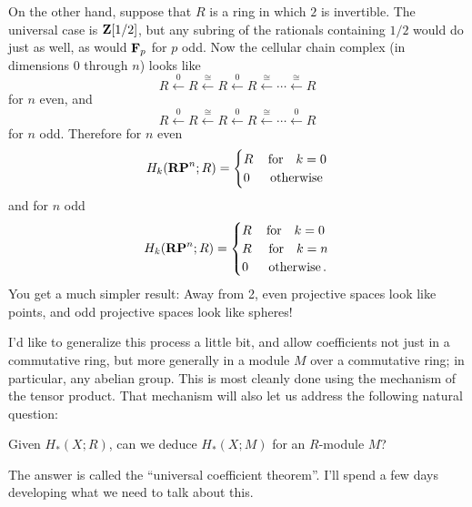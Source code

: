 On the other hand, suppose that $R$ is a ring in which $2$ is invertible.
The universal case is $\mathbf Z[1/2]$, but any subring of the rationals containing
$1/2$ would do just as well, as would $\mathbf F_p$ for $p$ odd. 
Now the cellular chain complex (in dimensions 0 through $n$)
looks like
\[
R\xleftarrow{0}R\xleftarrow{\cong}R\xleftarrow{0}R
\xleftarrow{\cong}\cdots\xleftarrow{\cong}R
\]
for $n$ even, and
\[
R\xleftarrow{0}R\xleftarrow{\cong}R\xleftarrow{0}R
\xleftarrow{\cong}\cdots\xleftarrow{0}R
\]
for $n$ odd. Therefore for $n$ even
\[
H_k(\mathbf{RP}^n;R)=
\begin{cases}R\,&\hbox{for}\quad k=0\\0\,&\,\hbox{otherwise}\end{cases}
\]
and for $n$ odd
\[
H_k(\mathbf{RP}^n;R)=
\begin{cases}R\,&\hbox{for}\quad k=0\\
R\,&\,\hbox{for}\quad k=n\\
0\,&\,\hbox{otherwise}\,.
\end{cases}
\]
You get a much simpler result: Away from 2, even projective spaces look like points, and odd projective spaces look like spheres!

I'd like to generalize this process a little bit, and allow coefficients 
not just in
a commutative ring, but more generally in a module $M$ over a commutative ring;
in particular, any abelian group. This is most cleanly done using the
mechanism of the tensor product. That mechanism will also let us address
the following natural question: 
\begin{question}
Given $H_*(X;R)$, can we deduce $H_*(X;M)$ for an $R$-module $M$?
\end{question}
The answer is called the ``universal coefficient theorem''. I'll spend a few days developing what we need to talk about this.



